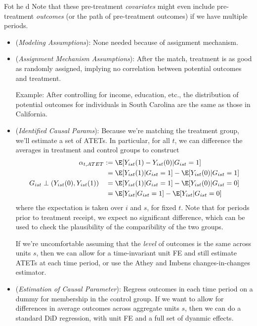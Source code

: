 \documentclass[12pt]{article}
\theoremstyle{plain}
\theoremstyle{definition}
\theoremstyle{remark}
\begin{document}
Fot he d
Note that these pre-treatment \emph{covariates} might even include
pre-treatment \emph{outcomes} (or the path of pre-treatment outcomes) if
we have multiple periods.
\begin{itemize}
  \item
    (\emph{Modeling Assumptions}):
    None needed because of assignment mechanism.

  \item
    (\emph{Assignment Mechanism Assumptions}):
    After the match, treatment is as good as randomly assigned,
    implying no correlation between potential outcomes and treatment.

    Example:
    After controlling for income, education, etc.,
    the distribution of potential outcomes for individuals in South
    Carolina are the same as those in California.

  \item
    (\emph{Identified Causal Params}):
    Because we're matching the treatment group, we'll estimate a set of
    ATETs.
    In particular, for all $t$, we can difference the averages in
    treatment and control groups to construct
    \begin{align*}
      \alpha_{t,ATET}
      :=&\;
      \E[Y_{ist}(1)-Y_{ist}(0)|G_{ist}=1]
      \\
      =&\;
      \E[Y_{ist}(1)|G_{ist}=1]
      -
      \E[Y_{ist}(0)|G_{ist}=1]
      \\
      G_{ist}\perp (Y_{ist}(0),Y_{ist}(1))
      \quad
      =&\;
      \E[Y_{ist}(1)|G_{ist}=1]
      -
      \E[Y_{ist}(0)|G_{ist}=0]
      \\
      =&\;
      \E[Y_{ist}|G_{ist}=1]
      -
      \E[Y_{ist}|G_{ist}=0]
    \end{align*}
    where the expectation is taken over $i$ and $s$, for fixed $t$.
    Note that for periods prior to treatment receipt, we expect no
    significant difference, which can be used to check the plausibility
    of the comparibility of the two groups.

    If we're uncomfortable assuming that the \emph{level} of outcomes is
    the same across units $s$, then we can allow for a time-invariant
    unit FE and still estimate ATETs at each time period, or use the
    Athey and Imbens changes-in-changes estimator.

  \item
    (\emph{Estimation of Causal Parameter}):
    Regress outcomes in each time period on a dummy for membership in
    the control group.
    If we want to allow for differences in average outcomes across
    aggregate units $s$, then we can do a standard DiD regression, with
    unit FE and a full set of dyanmic effects.


\end{itemize}
\end{document}
